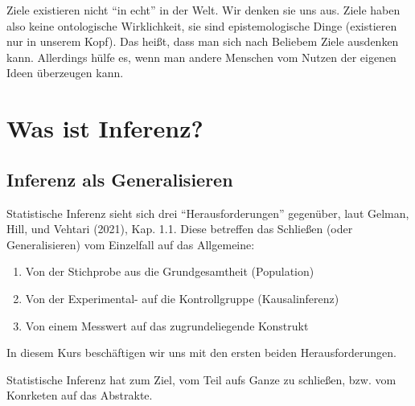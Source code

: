 \documentclass[
  a4paper,
  DIV=11]{scrreprt}
\providecommand{\tightlist}{%
  \setlength{\itemsep}{0pt}\setlength{\parskip}{0pt}}\usepackage{longtable,booktabs,array}
\theoremstyle{definition}
\theoremstyle{remark}
\begin{document}
\begin{tcolorbox}[enhanced jigsaw, leftrule=.75mm, left=2mm, bottomrule=.15mm, opacityback=0, coltitle=black, colbacktitle=quarto-callout-note-color!10!white, opacitybacktitle=0.6, rightrule=.15mm, toptitle=1mm, colback=white, colframe=quarto-callout-note-color-frame, arc=.35mm, toprule=.15mm, breakable, titlerule=0mm, bottomtitle=1mm, title=\textcolor{quarto-callout-note-color}{\faInfo}\hspace{0.5em}{Hinweis}]
Ziele existieren nicht ``in echt'' in der Welt. Wir denken sie uns aus.
Ziele haben also keine ontologische Wirklichkeit, sie sind
epistemologische Dinge (existieren nur in unserem Kopf). Das heißt, dass
man sich nach Beliebem Ziele ausdenken kann. Allerdings hülfe es, wenn
man andere Menschen vom Nutzen der eigenen Ideen überzeugen kann.
\end{tcolorbox}

\hypertarget{was-ist-inferenz}{%
\section{Was ist Inferenz?}\label{was-ist-inferenz}}

\hypertarget{inferenz-als-generalisieren}{%
\subsection{Inferenz als
Generalisieren}\label{inferenz-als-generalisieren}}

Statistische Inferenz sieht sich drei ``Herausforderungen'' gegenüber,
laut Gelman, Hill, und Vehtari (2021), Kap. 1.1. Diese betreffen das
Schließen (oder Generalisieren) vom Einzelfall auf das Allgemeine:

\begin{enumerate}
\def\labelenumi{\arabic{enumi}.}
\tightlist
\item
  Von der Stichprobe aus die Grundgesamtheit (Population)
\item
  Von der Experimental- auf die Kontrollgruppe (Kausalinferenz)
\item
  Von einem Messwert auf das zugrundeliegende Konstrukt
\end{enumerate}

In diesem Kurs beschäftigen wir uns mit den ersten beiden
Herausforderungen.

\begin{tcolorbox}[enhanced jigsaw, leftrule=.75mm, left=2mm, bottomrule=.15mm, opacityback=0, coltitle=black, colbacktitle=quarto-callout-important-color!10!white, opacitybacktitle=0.6, rightrule=.15mm, toptitle=1mm, colback=white, colframe=quarto-callout-important-color-frame, arc=.35mm, toprule=.15mm, breakable, titlerule=0mm, bottomtitle=1mm, title=\textcolor{quarto-callout-important-color}{\faExclamation}\hspace{0.5em}{Wichtig}]
Statistische Inferenz hat zum Ziel, vom Teil aufs Ganze zu schließen,
bzw. vom Konrketen auf das Abstrakte.
\end{tcolorbox}
\end{document}
